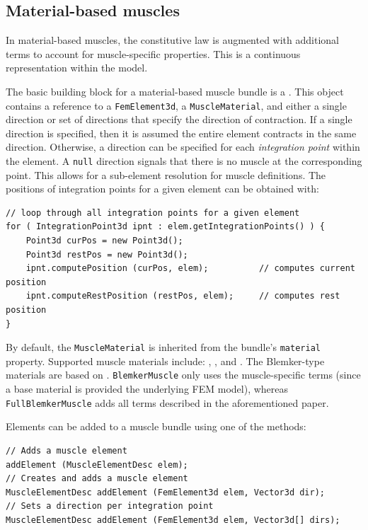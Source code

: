 \subsection{Material-based muscles}
\label{sec:fem:materialmuscle}

In material-based muscles, the constitutive law is augmented with additional
terms to account for muscle-specific properties.  This is a continuous 
representation within the model.  

The basic building block for a material-based muscle bundle is a 
.  This object contains
a reference to a {\tt FemElement3d}, a {\tt MuscleMaterial}, and either a
single direction or set of directions that specify the direction of 
contraction.  If a single direction is specified, then it is assumed the
entire element contracts in the same direction.  Otherwise, a direction
can be specified for each \emph{integration point} within the element.  A
{\tt null} direction signals that there is no muscle at the corresponding
point.  This allows for a sub-element resolution for muscle definitions. The 
positions of integration points for a given element can be obtained with:
\begin{lstlisting}[]
// loop through all integration points for a given element
for ( IntegrationPoint3d ipnt : elem.getIntegrationPoints() ) {
	Point3d curPos = new Point3d();
	Point3d restPos = new Point3d();
	ipnt.computePosition (curPos, elem);          // computes current position
	ipnt.computeRestPosition (restPos, elem);     // computes rest position
}
\end{lstlisting} 
By default, the {\tt MuscleMaterial} is inherited from the bundle's 
{\tt material} property.  Supported muscle materials include:
, 
, and 
.  The Blemker-type
materials are based on \cite{blemker:2005:muscle}.  {\tt BlemkerMuscle} only
uses the muscle-specific terms (since a base material is provided the 
underlying FEM model), whereas {\tt FullBlemkerMuscle} adds all terms described in 
the aforementioned paper.

Elements can be added to a muscle bundle using one of the methods:
\begin{lstlisting}[]
// Adds a muscle element
addElement (MuscleElementDesc elem);          
// Creates and adds a muscle element
MuscleElementDesc addElement (FemElement3d elem, Vector3d dir);     
// Sets a direction per integration point
MuscleElementDesc addElement (FemElement3d elem, Vector3d[] dirs);  
\end{lstlisting}

